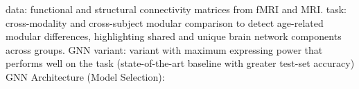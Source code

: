 data: functional and structural connectivity matrices from fMRI and MRI. 
task: cross-modality and cross-subject modular comparison 
to detect age-related modular differences, highlighting shared 
and unique brain network components across groups. 
GNN variant: variant with maximum expressing power that performs
well on the task (state-of-the-art baseline with greater test-set
accuracy)
GNN Architecture (Model Selection): 



